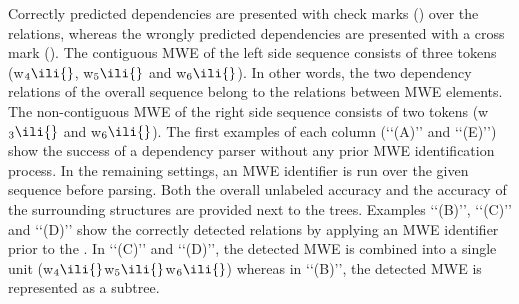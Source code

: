 \documentclass[output=paper]{LSP/langsci}
\begin{document}
Correctly\ili{} predicted\ili{} dependencies\ili{} \ili{}%
are\ili{} presented\ili{} with\ili{} check\ili{} marks\ili{} \ili{}(\ili{}\checkmark\ili{})\ili{} over\ili{} the\ili{} relations\ili{},\ili{} whereas\ili{} the\ili{} wrongly\ili{} predicted\ili{} dependencies\ili{} are\ili{} presented\ili{} with\ili{} a\ili{} cross\ili{} mark\ili{} \ili{}(\ili{}\ding{}\ili{})\ili{}.\ili{} \ili{}
The\ili{} contiguous\ili{} MWE\ili{} of\ili{} the\ili{} left\ili{} side\ili{} sequence\ili{} consists\ili{} of\ili{} three\ili{} tokens\ili{} \ili{}(w\ili{}$_4\ili{}$\ili{},\ili{} w\ili{}$_5\ili{}$\ili{} and\ili{} w\ili{}$_6\ili{}$\ili{})\ili{}.\ili{} In\ili{} other\ili{} words\ili{},\ili{} the\ili{} two\ili{} dependency\ili{} relations\ili{} of\ili{} the\ili{} overall\ili{} sequence\ili{} belong\ili{} to\ili{} the\ili{} relations\ili{} between\ili{} MWE\ili{} elements\ili{}.\ili{} The\ili{} non\ili{}-contiguous\ili{} MWE\ili{} of\ili{} the\ili{} right\ili{} side\ili{} sequence\ili{} consists\ili{} of\ili{} two\ili{} tokens\ili{} \ili{}(w\ili{}$_3\ili{}$\ili{} and\ili{} w\ili{}$_6\ili{}$\ili{})\ili{}.\ili{}
\ili{}
The\ili{} first\ili{} examples\ili{} of\ili{} each\ili{} column\ili{} \ili{}(\ili{}`\ili{}`\ili{}(A\ili{})\ili{}'\ili{}'\ili{} and\ili{} \ili{}`\ili{}`\ili{}(E\ili{})\ili{}'\ili{}'\ili{})\ili{} show\ili{} the\ili{} success\ili{} of\ili{} a\ili{} dependency\ili{} parser\ili{} without\ili{} any\ili{} prior\ili{} MWE\ili{} identification\ili{} process\ili{}.\ili{} \ili{}
In\ili{} the\ili{} remaining\ili{} settings\ili{},\ili{} an\ili{} MWE\ili{} identifier\ili{} is\ili{} run\ili{} over\ili{} the\ili{} given\ili{} sequence\ili{} before\ili{} parsing\ili{}.\ili{}
Both\ili{} the\ili{} overall\ili{} unlabeled\ili{} accuracy\ili{} \ili{}\asuo\ili{}{}\ili{} and\ili{} the\ili{} accuracy\ili{} of\ili{} the\ili{} surrounding\ili{} structures\ili{} \ili{}\asus\ili{}{}\ili{} are\ili{} provided\ili{} next\ili{} to\ili{} the\ili{} trees\ili{}.\ili{} Examples\ili{} \ili{}`\ili{}`\ili{}(B\ili{})\ili{}'\ili{}'\ili{},\ili{} \ili{}`\ili{}`\ili{}(C\ili{})\ili{}'\ili{}'\ili{} and\ili{} \ili{}`\ili{}`\ili{}(D\ili{})\ili{}'\ili{}'\ili{} show\ili{} the\ili{} correctly\ili{} detected\ili{} relations\ili{} by\ili{} applying\ili{} an\ili{} MWE\ili{} identifier\ili{} prior\ili{} to\ili{} the\ili{} \ili{}\isi{}\ili{}.\ili{} In\ili{} \ili{}`\ili{}`\ili{}(C\ili{})\ili{}'\ili{}'\ili{} and\ili{} \ili{}`\ili{}`\ili{}(D\ili{})\ili{}'\ili{}'\ili{},\ili{} the\ili{} detected\ili{} MWE\ili{} is\ili{} combined\ili{} into\ili{} a\ili{} single\ili{} unit\ili{} \ili{}(w\ili{}$_4\ili{}$w\ili{}$_5\ili{}$w\ili{}$_6\ili{}$\ili{})\ili{} whereas\ili{} in\ili{} \ili{}`\ili{}`\ili{}(B\ili{})\ili{}'\ili{}'\ili{},\ili{} the\ili{} detected\ili{} MWE\ili{} is\ili{} represented\ili{} as\ili{} a\ili{} subtree\ili{}.\ili{} \ili{}%
\end{document}
